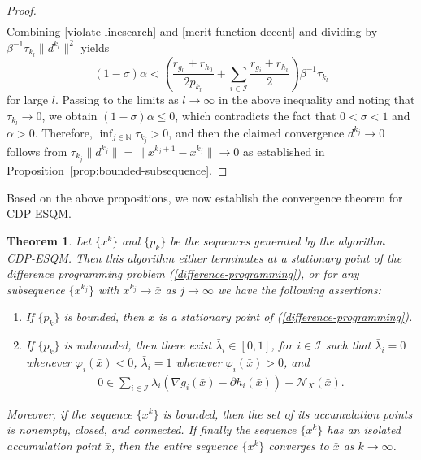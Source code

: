 \documentclass[11pt,a4paper]{article}
\newtheorem{theorem}{Theorem}[section]
\theoremstyle{plain}
\begin{document}
\begin{proof}
\begin{equation}
\begin{aligned}
\end{aligned}
\end{equation}
Combining \eqref{violate linesearch} and \eqref{merit function decent} and dividing by $\beta^{-1}\tau_{k_l}\|d^{k_l}\|^2$ yields 
\begin{equation*}
(1-\sigma)\alpha < \left(\frac{r_{g_0} + r_{h_0}}{2p_{k_l}} + \sum_{i\in\mathcal I} \frac{r_{g_i} + r_{h_i}}{2}\right)\beta^{-1}\tau_{k_l}
\end{equation*}
for large $l$. Passing to the limits as $l\to\infty$ in the above inequality and noting that $\tau_{k_l} \rightarrow 0$, we obtain $(1-\sigma)\alpha \leq 0$, which contradicts the fact that $0<\sigma < 1$ and $\alpha>0$. Therefore, $\inf_{j \in \mathbb{N}} \tau_{k_j} > 0$, and then the claimed convergence $d^{k_j} \rightarrow 0$ follows from $\tau_{k_j}\|d^{k_j}\| = \|x^{k_j+1} - x^{k_j} \| \rightarrow 0$ as established in Proposition~\ref{prop:bounded-subsequence}.
\end{proof}\vspace*{0.07in}

Based on the above propositions, we now establish the convergence theorem for CDP-ESQM.

\begin{theorem}\label{general problem convergence}
Let \( \{x^k\} \) and $\{p_k\}$ be the sequences generated by the algorithm CDP-ESQM. 
Then this algorithm either terminates at a stationary point of the difference programming problem {\rm(\ref{difference-programming})}, or for any subsequence $\{x^{k_j}\}$ with $x^{k_j} \rightarrow \bar{x}$ as $j \rightarrow \infty$ we have the following assertions:
\begin{enumerate}  
\item[\bf(i)] If $\{p_k\}$ is bounded, then \( \bar{x} \) is a stationary point of {\rm(\ref{difference-programming})}.
    
\item[\bf(ii)] If $\{p_k\}$ is unbounded, then there exist $\bar{\lambda}_i \in [0,1]$, for $i\in\mathcal{I}$ such that $\bar{\lambda}_i =0$ whenever $\varphi_i(\bar x)<0$, $\bar{\lambda}_i =1$ whenever $\varphi_i(\bar x)>0$, and
\begin{equation*}
    \begin{aligned}
        0\in\sum_{i\in\mathcal I}\lambda_i\left(\nabla g_i(\bar x)-\partial h_i(\bar x)\right)+\mathcal{N}_X(\bar x).
    \end{aligned}
\end{equation*}
\end{enumerate}  
Moreover, if the sequence $\{x^k\}$ is bounded, then the set of its accumulation points is nonempty, closed, and connected. If finally the sequence \( \{x^k\} \) has an isolated accumulation point \( \bar x \), then the entire sequence \( \{x^k\} \) converges to \( \bar x \) as $k\to\infty$.
\end{theorem}
\end{document}
